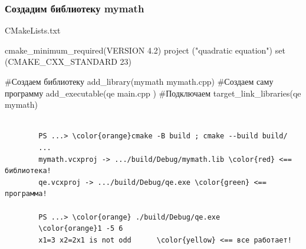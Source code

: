 \documentclass[9pt, aspectratio=1610]{beamer}
\begin{document}
\begin{frame}[fragile]\frametitle{Создадим библиотеку mymath}
	
	\begin{block}{CMakeLists.txt}
		\begin{cmakecode}
			cmake_minimum_required(VERSION 4.2)
			project ("quadratic equation")
			set (CMAKE_CXX_STANDARD 23)
			
			#Создаем библиотеку
			add_library(mymath mymath.cpp)
			#Создаем саму программу
			add_executable(qe main.cpp )
			#Подключаем
			target_link_libraries(qe mymath)
		\end{cmakecode}
	\end{block}
	
	\pause
	
	\begin{Verbatim}[bgcolor=black,tabsize=4,formatcom=\color{white},gobble=2,fontsize=\small, commandchars=\\\{\}, xleftmargin=0em, frame=single,framerule=0pt ,rulecolor=\color{red},framesep=1em,fillcolor=\color{black}]
		
		PS ...> \color{orange}cmake -B build ; cmake --build build/
		...
		mymath.vcxproj -> .../build/Debug/mymath.lib \color{red} <== библиотека!
		qe.vcxproj -> .../build/Debug/qe.exe \color{green} <== программа!
		
		PS ...> \color{orange} ./build/Debug/qe.exe
		\color{orange}1 -5 6
		x1=3 x2=2x1 is not odd      \color{yellow} <== все работает!

		
	\end{Verbatim}
	
\end{frame}
\end{document}
